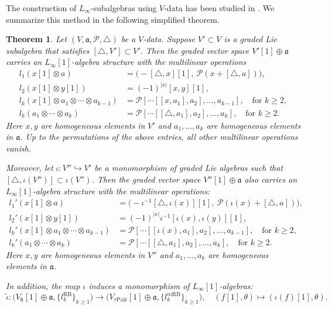 \documentclass[12pt]{amsart}
\newtheorem{theorem}{Theorem}[section]
\theoremstyle{definition}
\begin{document}
The construction of $L_\infty$-subalgebras using $V$-data has been studied in \cite{DM22, FZ15, LQYZ24}. We summarize this method in the following simplified theorem.


\begin{theorem}\label{v-th}
Let $(V, \mathfrak{a}, \mathcal{P}, \triangle)$ be a $V$-data. Suppose $V' \subset V$ is a graded Lie subalgebra that satisfies $[\triangle, V'] \subset V'$. Then the graded vector space $V'[1] \oplus \mathfrak{a}$ carries an $L_\infty[1]$-algebra structure with the multilinear operations
\begin{align*}
	l_1 (x[1] \otimes a) &= \big( -[\triangle, x][1],~ \mathcal{P}(x + [\triangle, a]) \big),\\
	l_2 (x[1] \otimes y[1]) &= (-1)^{|x|} [x, y][1],\\
	l_k (x[1] \otimes a_1 \otimes \cdots \otimes a_{k-1}) &= \mathcal{P} \left[ \cdots [[x, a_1], a_2], \ldots, a_{k-1} \right], \quad \text{for } k \geq 2,\\
	l_k (a_1 \otimes \cdots \otimes a_k) &= \mathcal{P} \left[ \cdots [[\triangle, a_1], a_2], \ldots, a_k \right], \quad \text{for } k \geq 2.
\end{align*}
Here $x, y$ are homogeneous elements in $V'$ and $a_1, \ldots, a_k$ are homogeneous elements in $\mathfrak{a}$. Up to the permutations of the above entries, all other multilinear operations vanish.

Moreover, let $\iota: V'' \hookrightarrow V'$ be a monomorphism of graded Lie algebras such that $[\triangle, \iota(V'')] \subset \iota(V'')$. Then the graded vector space $V''[1] \oplus \mathfrak{a}$ also carries an $L_\infty[1]$-algebra structure with the multilinear operations:
\begin{align*}
	l_1' (x[1] \otimes a) &= \big( -\iota^{-1}[\triangle, \iota(x)][1],~ \mathcal{P}(\iota(x) + [\triangle, a]) \big),\\
	l_2' (x[1] \otimes y[1]) &= (-1)^{|x|} \iota^{-1}[\iota(x), \iota(y)][1],\\
	l_k' (x[1] \otimes a_1 \otimes \cdots \otimes a_{k-1}) &= \mathcal{P} \left[ \cdots [[\iota(x), a_1], a_2], \ldots, a_{k-1} \right], \quad \text{for } k \geq 2,\\
	l_k' (a_1 \otimes \cdots \otimes a_k) &= \mathcal{P} \left[ \cdots [[\triangle, a_1], a_2], \ldots, a_k \right], \quad \text{for } k \geq 2.
\end{align*}
Here $x, y$ are homogeneous elements in $V''$ and $a_1, \ldots, a_k$ are homogeneous elements in $\mathfrak{a}$.

In addition, the map $\iota$ induces a monomorphism of $L_\infty[1]$-algebras:
\[
\tilde{\iota} : \big(V_{\mathfrak{h}}[1] \oplus \mathfrak{a}, \{l^{\mathrm{RB}}_k\}_{k \geq 1} \big)
\longrightarrow
\big(V_{r\mathrm{Pair}}[1] \oplus \mathfrak{a}, \{l^{m\mathrm{RB}}_k\}_{k \geq 1} \big), \quad
(f[1], \theta) \mapsto (\iota(f)[1], \theta).
\]
\end{theorem}
\end{document}
